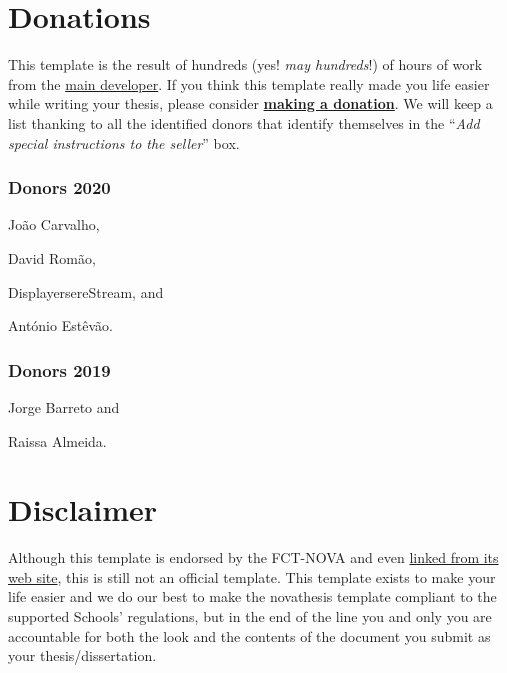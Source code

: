 \section{Donations}
\label{sec:donations}

This template is the result of hundreds (yes! \emph{may hundreds}!) of hours of work from the \href{https://docentes.fct.unl.pt/joao-lourenco}{main developer}.  If you think this template really made you life easier while writing your thesis, please consider \href{https://paypal.me/novathesis}{\textbf{making a donation}}. We will keep a list thanking to all the identified donors that identify themselves in the “\emph{Add special instructions to the seller}” box.

\subsubsection*{Donors 2020}
\label{ssub:donors_2020}

\begin{inparaitem}[]
  \item João Carvalho, 
  \item David Romão, 
  \item DisplayersereStream, and
  \item António Estêvão.  
\end{inparaitem}

\subsubsection*{Donors 2019}
\label{ssub:donors_2019}

\begin{inparaitem}[]
  \item Jorge Barreto and
  \item Raissa Almeida.  
\end{inparaitem}



\section{Disclaimer}
\label{sec:disclaimer}

Although this template is endorsed by the FCT-NOVA and even \href{https://www.fct.unl.pt/estudante/informacao-academica}{linked from its web site}, this is still not an official template.
%
This template exists to make your life easier and we do our best to make the \gls{novathesis} template compliant to the supported Schools' regulations, but in the end of the line you and only you are accountable for both the look and the contents of the document you submit as your thesis/dissertation.


